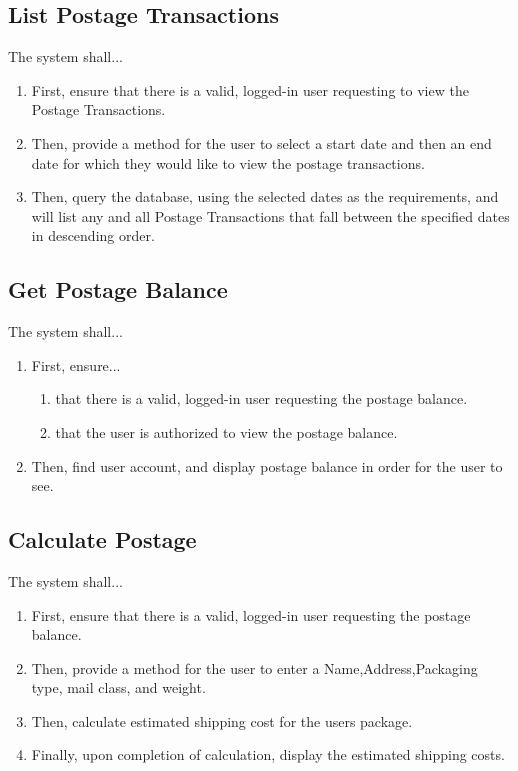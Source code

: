 \documentclass{scrreprt}
\begin{document}
\subsection{List Postage Transactions}

The system shall...

\begin{enumerate}
\item First, ensure that there is a valid, logged-in user requesting to view
the Postage Transactions.
\item Then, provide a method for the user to select a start
date and then an end date for which they would like to view the postage
transactions.
\item Then, query the database, using the selected dates as
the requirements, and will list any and all Postage Transactions that fall
between the specified dates in descending order.
\end{enumerate}

\subsection{Get Postage Balance}

The system shall...

\begin{enumerate}
\item First, ensure...
\begin{enumerate}
\item that there is a valid, logged-in user requesting the postage balance.
\item that the user is authorized to view the postage balance.
\end{enumerate}
\item Then, find user account, and display postage balance in order for the
user to see.
\end{enumerate}

\subsection{Calculate Postage}

The system shall...

\begin{enumerate}
\item First, ensure that there is a valid, logged-in user requesting the
postage balance.  
\item Then, provide a method for the user to enter a Name,Address,Packaging
type, mail class, and weight.
\item Then, calculate estimated shipping cost for the users package.
\item Finally, upon completion of calculation, display the estimated shipping
costs.  
\end{enumerate}
\end{document}
